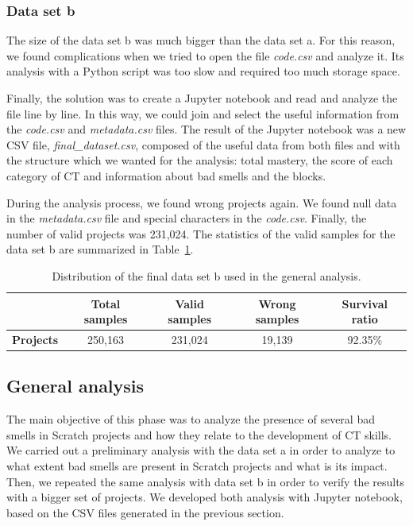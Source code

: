 \subsubsection{Data set b}
\label{subsubsec:datacollection_b}

The size of the data set b was much bigger than the data set a. For this reason, we found complications when we tried to open the file \textit{code.csv} and analyze it. Its analysis with a Python script was too slow and required too much storage space.

Finally, the solution was to create a Jupyter notebook and read and analyze the file line by line. In this way, we could join and select the useful information from the \textit{code.csv} and \textit{metadata.csv} files. The result of the Jupyter notebook was a new CSV file, \textit{final\_dataset.csv}, composed of the useful data from both files and with the structure which we wanted for the analysis: total mastery, the score of each category of CT and information about bad smells and the blocks. 

During the analysis process, we found wrong projects again. We found null data in the \textit{metadata.csv} file and special characters in the \textit{code.csv}. Finally, the number of valid projects was 231,024. The statistics of the valid samples for the data set b are summarized in Table~\ref{table:datacollection_b}.

\begin{table}
 \begin{center}
  \begin{tabular}{|c|c|c|c|c|}
    \hline
     & \textbf{Total samples} & \textbf{Valid samples} & \textbf{Wrong samples} & \textbf{Survival ratio} \\ \hline
    \textbf{Projects} & 250,163 & 231,024 & 19,139 & 92.35\% \\ \hline
  \end{tabular}
  \caption{Distribution of the final data set b used in the general analysis.}
  \label{table:datacollection_b}
 \end{center}
\end{table}
    

\subsection{General analysis}
\label{subsec:generalanalysis}

The main objective of this phase was to analyze the presence of several bad smells in Scratch projects and how they relate to the development of CT skills. We carried out a preliminary analysis with the data set a in order to analyze to what extent bad smells are present in Scratch projects and what is its impact. Then, we repeated the same analysis with data set b in order to verify the results with a bigger set of projects. We developed both analysis with Jupyter notebook, based on the CSV files generated in the previous section. 

